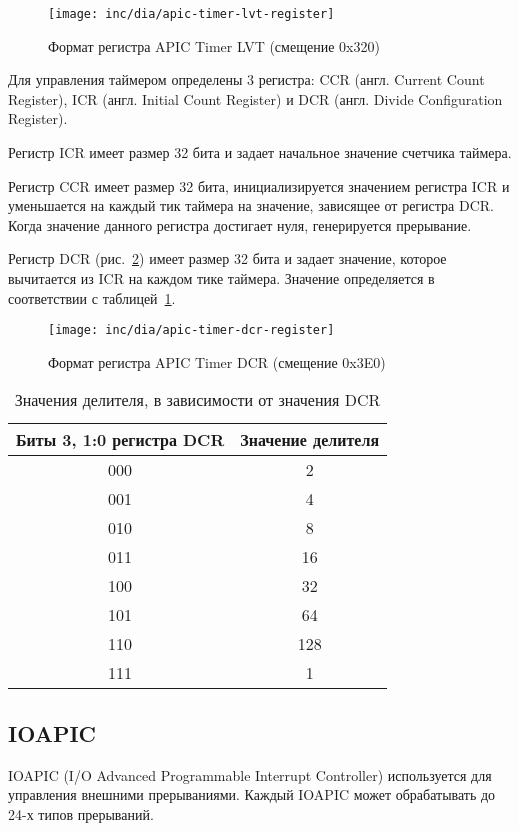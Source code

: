 \begin{figure}[ht!]
  \centering
  \texttt{[image: inc/dia/apic-timer-lvt-register]}
  \caption{Формат регистра APIC Timer LVT (смещение 0x320)}
  \label{fig:apic-timer-lvt-register}
\end{figure}

Для управления таймером определены 3 регистра: CCR (англ. Current Count Register),
ICR (англ. Initial Count Register) и DCR (англ. Divide Configuration Register).

Регистр ICR имеет размер 32 бита и задает начальное значение счетчика таймера.

Регистр CCR имеет размер 32 бита, инициализируется значением регистра ICR и
уменьшается на каждый тик таймера на значение, зависящее от регистра DCR. Когда значение
данного регистра достигает нуля, генерируется прерывание.

Регистр DCR (рис.~\ref{fig:apic-timer-dcr-register}) имеет размер 32 бита и задает значение, которое вычитается из ICR
на каждом тике таймера. Значение определяется в соответствии с таблицей~\ref{tab:apic_timer_dcr_values}.
\begin{figure}[ht!]
  \centering
  \texttt{[image: inc/dia/apic-timer-dcr-register]}
  \caption{Формат регистра APIC Timer DCR (смещение 0x3E0)}
  \label{fig:apic-timer-dcr-register}
\end{figure}

\begin{table}[ht!]
  \centering
  \caption{Значения делителя, в зависимости от значения DCR}
  \label{tab:apic_timer_dcr_values}
  \begin{tabular}{|c|c|}
    \hline
    Биты 3, 1:0 регистра DCR & Значение делителя \\
    \hline
    000 & 2 \\
    \hline
    001 & 4 \\
    \hline
    010 & 8 \\
    \hline
    011 & 16 \\
    \hline
    100 & 32 \\
    \hline
    101 & 64 \\
    \hline
    110 & 128 \\
    \hline
    111 & 1 \\
    \hline
  \end{tabular}
\end{table}

\subsection{IOAPIC}
IOAPIC (I/O Advanced Programmable Interrupt Controller) используется для
управления внешними прерываниями. Каждый IOAPIC может обрабатывать до 24-х типов прерываний.

